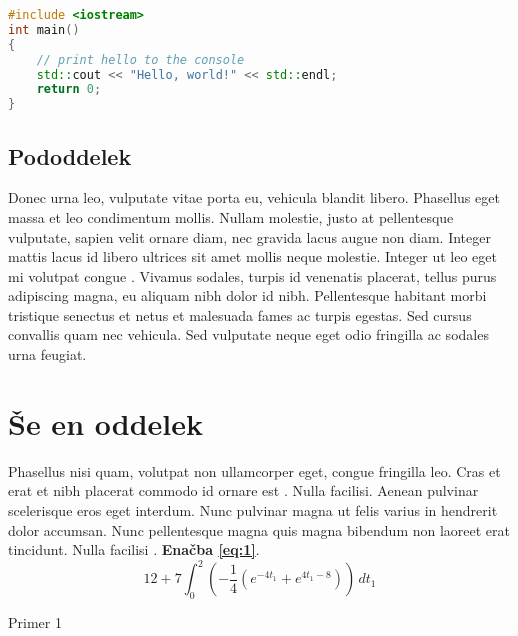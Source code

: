 \begin{lstlisting}[language=C++, caption={Primer programske kode}]
#include <iostream>
int main()
{
    // print hello to the console
    std::cout << "Hello, world!" << std::endl;
    return 0;
}
\end{lstlisting}

\subsection{Pododdelek}

Donec urna leo, vulputate vitae porta eu, vehicula blandit libero. Phasellus eget massa et leo condimentum mollis. Nullam molestie, justo at pellentesque vulputate, sapien velit ornare diam, nec gravida lacus augue non diam. Integer mattis lacus id libero ultrices sit amet mollis neque molestie. Integer ut leo eget mi volutpat congue \cite{druzovec2010information}. Vivamus sodales, turpis id venenatis placerat, tellus purus adipiscing magna, eu aliquam nibh dolor id nibh. Pellentesque habitant morbi tristique senectus et netus et malesuada fames ac turpis egestas. Sed cursus convallis quam nec vehicula. Sed vulputate neque eget odio fringilla ac sodales urna feugiat.

\section{Še en oddelek}

Phasellus nisi quam, volutpat non ullamcorper eget, congue fringilla leo. Cras et erat et nibh placerat commodo id ornare est \cite{donaj2017speech}. Nulla facilisi. Aenean pulvinar scelerisque eros eget interdum. Nunc pulvinar magna ut felis varius in hendrerit dolor accumsan. Nunc pellentesque magna quis magna bibendum non laoreet erat tincidunt. Nulla facilisi \cite{jesenko2017two}. \textbf{Enačba \ref{eq:1}}.
\begin{equation} \label{eq:1}
12+7 \int_0^2
  \left(
    -\frac{1}{4}\left(e^{-4t_1}+e^{4t_1-8}\right)
  \right)\,dt_1
\end{equation}


\begin{chart}[htb]
\begin{center}
\end{center}
 \caption{Primer 1}
    \label{fig:graf_1}
\end{chart}

